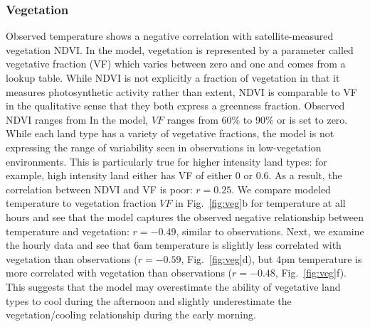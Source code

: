\subsubsection{Vegetation}
Observed temperature shows a negative correlation with satellite-measured vegetation NDVI. In the model, vegetation is represented by a parameter called vegetative fraction (VF) which varies between zero and one and comes from a lookup table.%
While NDVI is not explicitly a fraction of vegetation in that it measures photosynthetic activity rather than extent, NDVI is comparable to VF in the qualitative sense that they both express a greenness fraction. Observed NDVI ranges from In the model, $VF$ ranges from 60\% to 90\% or is set to zero. While each land type has a variety of vegetative fractions, the model is not expressing the range of variability seen in observations in low-vegetation environments. This is particularly true for higher intensity land types: for example, high intensity land either has VF of either 0 or 0.6. As a result, the correlation between NDVI and VF is poor: $r=0.25$. 
We compare modeled temperature to vegetation fraction $VF$ in Fig.~\ref{fig:veg}b for temperature at all hours and see that
the model captures the observed negative relationship between temperature and vegetation: $r= -0.49$, similar to observations. Next, we examine the hourly data and see that 6am temperature is slightly less correlated with vegetation than observations ($r= -0.59$, Fig.~\ref{fig:veg}d), but 4pm temperature is more correlated with vegetation than observations ($r= -0.48$, Fig.~\ref{fig:veg}f). This suggests that the model may overestimate the ability of vegetative land types to cool during the afternoon and slightly underestimate the vegetation/cooling relationship during the early morning. 

